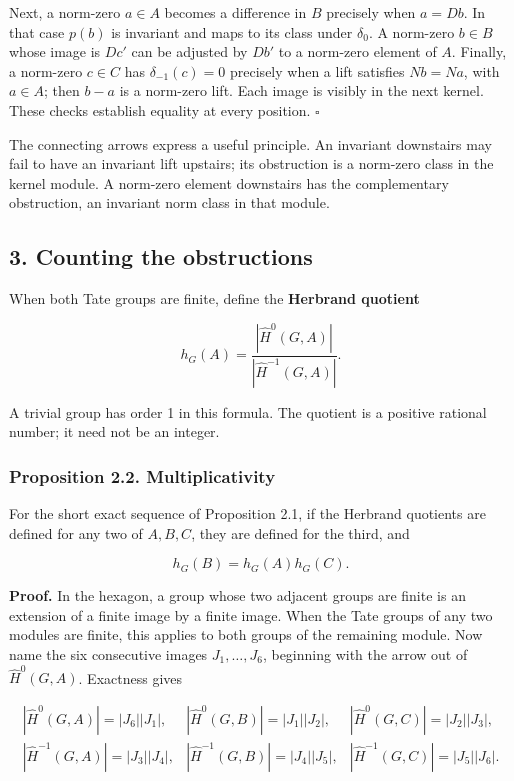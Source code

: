 \documentclass[11pt,a4paper]{article}
\begin{document}
Next, a norm-zero \(a\in A\) becomes a difference in \(B\) precisely
when \(a=Db\). In that case \(p(b)\) is invariant and maps to its class
under \(\delta_0\). A norm-zero \(b\in B\) whose image is \(Dc'\) can be
adjusted by \(Db'\) to a norm-zero element of \(A\). Finally, a
norm-zero \(c\in C\) has \(\delta_{-1}(c)=0\) precisely when a lift
satisfies \(Nb=Na\), with \(a\in A\); then \(b-a\) is a norm-zero lift.
Each image is visibly in the next kernel. These checks establish
equality at every position. \(\square\)

The connecting arrows express a useful principle. An invariant
downstairs may fail to have an invariant lift upstairs; its obstruction
is a norm-zero class in the kernel module. A norm-zero element
downstairs has the complementary obstruction, an invariant norm class in
that module.

\subsection{3. Counting the
obstructions}\label{counting-the-obstructions}

When both Tate groups are finite, define the \textbf{Herbrand quotient}

\[
h_G(A)=\frac{|\widehat H^0(G,A)|}{|\widehat H^{-1}(G,A)|}.
\]

A trivial group has order 1 in this formula. The quotient is a positive
rational number; it need not be an integer.

\subsubsection{Proposition 2.2.
Multiplicativity}\label{proposition-2.2.-multiplicativity}

For the short exact sequence of Proposition 2.1, if the Herbrand
quotients are defined for any two of \(A,B,C\), they are defined for the
third, and

\[
h_G(B)=h_G(A)h_G(C).
\]

\textbf{Proof.} In the hexagon, a group whose two adjacent groups are
finite is an extension of a finite image by a finite image. When the
Tate groups of any two modules are finite, this applies to both groups
of the remaining module. Now name the six consecutive images
\(J_1,\ldots,J_6\), beginning with the arrow out of
\(\widehat H^0(G,A)\). Exactness gives

\[
\begin{array}{lll}
|\widehat H^0(G,A)|=|J_6||J_1|,&
|\widehat H^0(G,B)|=|J_1||J_2|,&
|\widehat H^0(G,C)|=|J_2||J_3|,\\
|\widehat H^{-1}(G,A)|=|J_3||J_4|,&
|\widehat H^{-1}(G,B)|=|J_4||J_5|,&
|\widehat H^{-1}(G,C)|=|J_5||J_6|.
\end{array}
\]
\end{document}
